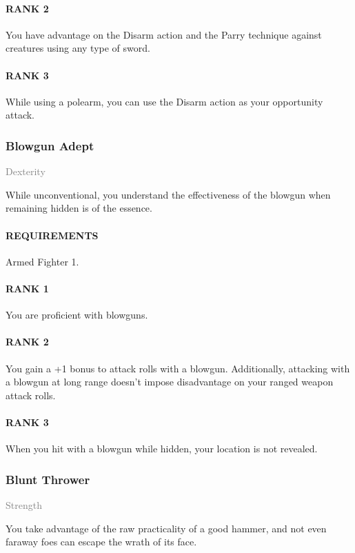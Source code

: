 \paragraph{RANK 2} You have advantage on the Disarm action and the Parry technique against creatures using any type of sword.
\paragraph{RANK 3} While using a polearm, you can use the Disarm action as your opportunity attack.

\subsubsection{Blowgun Adept} \label{feat::blowgunadept}
\small{\textcolor{gray}{Dexterity}}

\normalsize
While unconventional, you understand the effectiveness of the blowgun when remaining hidden is of the essence.
\paragraph{REQUIREMENTS} Armed Fighter 1.
\paragraph{RANK 1} You are proficient with blowguns.
\paragraph{RANK 2} You gain a +1 bonus to attack rolls with a blowgun.
Additionally, attacking with a blowgun at long range doesn't impose disadvantage on your ranged weapon attack rolls.
\paragraph{RANK 3} When you hit with a blowgun while hidden, your location is not revealed.

\subsubsection{Blunt Thrower} \label{feat::bluntthrower}
\small{\textcolor{gray}{Strength}}

\normalsize
You take advantage of the raw practicality of a good hammer, and not even faraway foes can escape the wrath of its face.
